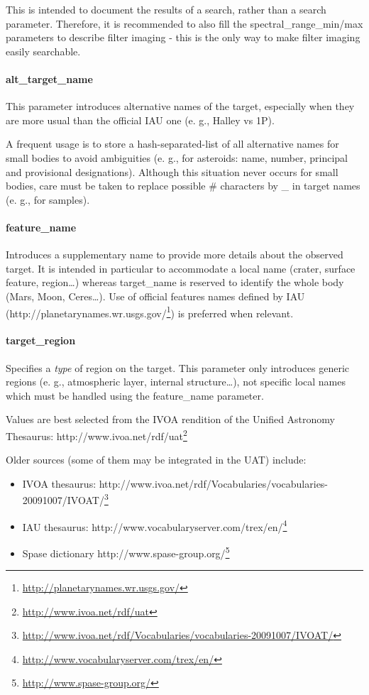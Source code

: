 \documentclass[11pt,a4paper]{ivoa}
\begin{document}
This is intended to document the results of a search, rather than a search parameter. Therefore, it is recommended to also fill the spectral\_range\_min/max parameters to describe filter imaging - this is the only way to make filter imaging easily searchable.

\paragraph{alt\_target\_name}

This parameter introduces alternative names of the target, especially when they are more usual than the official IAU one (e. g., Halley vs 1P).

A frequent usage is to store a hash-separated-list of all alternative names for small bodies to avoid ambiguities (e. g., for asteroids: name, number, principal and provisional designations). Although this situation never occurs for small bodies, care must be taken to replace possible \# characters by \_ in target names (e. g., for samples).

\paragraph{feature\_name}

Introduces a supplementary name to provide more details about the observed target. It is intended in particular to accommodate a local name (crater, surface feature, region…) whereas target\_name is reserved to identify the whole body (Mars, Moon, Ceres…). Use of official features names defined by IAU (http://planetarynames.wr.usgs.gov/\footnote{\url{http://planetarynames.wr.usgs.gov/}}) is preferred when relevant.

\paragraph{target\_region}

Specifies a \emph{type} of region on the target. This parameter only introduces generic regions  (e. g., atmospheric layer, internal structure…), not specific local names which must be handled using the feature\_name parameter.

Values are best selected from the IVOA rendition of the Unified Astronomy Thesaurus: http://www.ivoa.net/rdf/uat\footnote{\url{http://www.ivoa.net/rdf/uat}}

Older sources (some of them may be integrated in the UAT) include:

\begin{itemize}
\item IVOA thesaurus: http://www.ivoa.net/rdf/Vocabularies/vocabularies-20091007/IVOAT/\footnote{\url{http://www.ivoa.net/rdf/Vocabularies/vocabularies-20091007/IVOAT/}}
\item IAU thesaurus: http://www.vocabularyserver.com/trex/en/\footnote{\url{http://www.vocabularyserver.com/trex/en/}}
\item Spase dictionary http://www.spase-group.org/\footnote{\url{http://www.spase-group.org/}}
\end{itemize}
\end{document}
